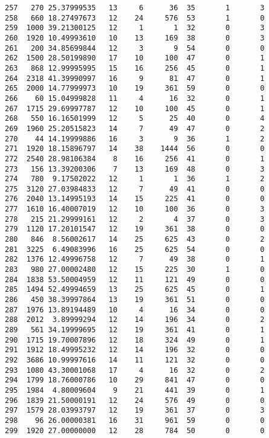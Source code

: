 \documentclass[
  letterpaper,
  DIV=11,
  numbers=noendperiod]{scrreprt}
\begin{document}
\begin{verbatim}
257   270 25.37999535   13     6      36  35       1       3
258   660 18.27497673   12    24     576  53       1       0
259  1000 39.21300125   12     1       1  32       0       3
260  1920 10.49993610   10    13     169  38       0       3
261   200 34.85699844   12     3       9  54       0       0
262  1500 28.50199890   17    10     100  47       0       1
263   868 12.99995995   15    16     256  45       0       1
264  2318 41.39990997   16     9      81  47       0       1
265  2000 14.77999973   10    19     361  59       0       0
266    60 15.04999828   11     4      16  32       0       1
267  1715 29.69997787   12    10     100  45       0       1
268   550 16.16501999   12     5      25  40       0       4
269  1960 25.20515823   14     7      49  47       0       2
270    44 14.19999886   16     3       9  36       1       2
271  1920 18.15896797   14    38    1444  56       0       0
272  2540 28.98106384    8    16     256  41       0       1
273   156 13.39200306    7    13     169  48       0       3
274   780  9.17502022   12     1       1  36       1       2
275  3120 27.03984833   12     7      49  41       0       0
276  2040 13.14995193   14    15     225  41       0       0
277  1610 16.40007019   12    10     100  36       0       3
278   215 21.29999161   12     2       4  37       0       3
279  1120 17.20101547   12    19     361  38       0       0
280   846  8.56002617   14    25     625  43       0       2
281  3225  6.49083996   16    25     625  54       0       0
282  1376 12.49996758   12     7      49  38       0       1
283   980 27.00002480   12    15     225  30       1       0
284  1838 53.50004959   12    11     121  49       0       0
285  1494 52.49994659   13    25     625  45       0       1
286   450 38.39997864   13    19     361  51       0       0
287  1976 13.89194489   10     4      16  34       0       0
288  2012  3.89999294   12    14     196  34       0       2
289   561 34.19999695   12    19     361  41       0       1
290  1715 19.70007896   12    18     324  49       0       1
291  1912 18.49995232   12    14     196  32       0       0
292  3686 10.99997616   14    11     121  32       0       0
293  1080 43.30001068   17     4      16  32       0       2
294  1799 18.76000786   10    29     841  47       0       0
295  1984  4.80009604    9    21     441  39       0       1
296  1839 21.50000191   12    24     576  49       0       0
297  1579 28.03993797   12    19     361  37       0       3
298    96 26.00000381   16    31     961  59       0       0
299  1920 27.00000000   12    28     784  50       0       0

\end{verbatim}
\end{document}
